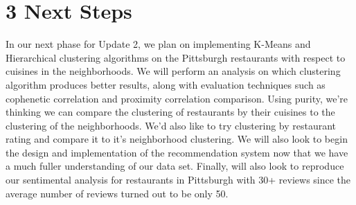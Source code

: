 \documentclass{neu_handout}
\begin{document}
\section*{3 Next Steps}
In our next phase for Update 2, we plan on implementing K-Means and Hierarchical clustering algorithms on the Pittsburgh restaurants with respect to cuisines in the neighborhoods. We will perform an analysis on which clustering algorithm produces better results, along with evaluation techniques such as cophenetic correlation and proximity correlation comparison. Using purity, we're thinking we can compare the clustering of restaurants by their cuisines to the clustering of the neighborhoods. We'd also like to try clustering by restaurant rating and compare it to it's neighborhood clustering. We will also look to begin the design and implementation of the recommendation system now that we have a much fuller understanding of our data set. Finally, will also look to reproduce our sentimental analysis for restaurants in Pittsburgh with 30+ reviews since the average number of reviews turned out to be only 50. 
\end{document}
